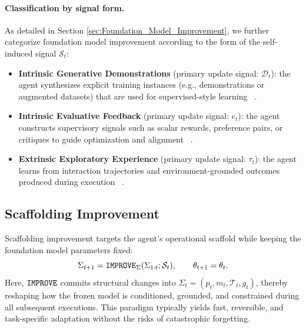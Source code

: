 \paragraph{Classification by signal form.}
As detailed in Section \ref{sec:Foundation_Model_Improvement}, we further categorize foundation model improvement according to the form of the self-induced signal $\mathcal{S}_t$:
\begin{itemize}
    \item \textbf{Intrinsic Generative Demonstrations} (primary update signal: $\mathcal{D}_t$):
    the agent synthesizes explicit training instances (e.g., demonstrations or augmented datasets) that are used for supervised-style learning
    ~\citep{wang2022self, lu2023self, zhao2024selfguidebettertaskspecificinstruction, shi2025taskcraft}.

    \item \textbf{Intrinsic Evaluative Feedback} (primary update signal: $e_t$):
    the agent constructs supervisory signals such as scalar rewards, preference pairs, or critiques to guide optimization and alignment
    ~\citep{gong2025strive, huang2025beyond, bai2022constitutional, bensal2025reflect, zhang2025adaptive}.

    \item \textbf{Extrinsic Exploratory Experience} (primary update signal: $\tau_t$):
    the agent learns from interaction trajectories and environment-grounded outcomes produced during execution
    ~\citep{wei2025codearc, dong2025tool, da2025agent, sun2025seagentselfevolvingcomputeruse}.
\end{itemize}

\subsection{Scaffolding Improvement}
\label{subsec:Scaffolding_Improvement_(The_Non_Parametric_Fast_Loop)}

Scaffolding improvement targets the agent’s operational scaffold while keeping the foundation model parameters fixed:
\begin{equation}
    \Sigma_{t+1} = \operatorname{\mathtt{IMPROVE}}_{\Sigma}(\Sigma_{1:t}; \mathcal{S}_{t}),
    \qquad
    \theta_{t+1} = \theta_{t}.
\end{equation}
Here, $\operatorname{\mathtt{IMPROVE}}$ commits structural changes into $\Sigma_t=(p_t,m_t,\mathcal{T}_t,g_t)$,
thereby reshaping how the frozen model is conditioned, grounded, and constrained during all subsequent executions. This paradigm typically yields fast, reversible, and task-specific adaptation without the risks of catastrophic forgetting.

